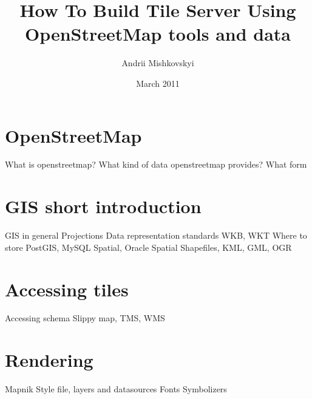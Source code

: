\documentclass{article}
\begin{document}
\title{How To Build Tile Server Using OpenStreetMap tools and data}
\author{Andrii Mishkovskyi}
\date{March 2011}

\maketitle

\section{OpenStreetMap}

What is openstreetmap?
What kind of data openstreetmap provides?
What form


\section{GIS short introduction}

GIS in general
Projections
Data representation standards
WKB, WKT
Where to store
PostGIS, MySQL Spatial, Oracle Spatial
Shapefiles, KML, GML, OGR

\section{Accessing tiles}

Accessing schema
Slippy map, TMS, WMS

\section{Rendering}

Mapnik
Style file, layers and datasources
Fonts
Symbolizers
\end{document}
